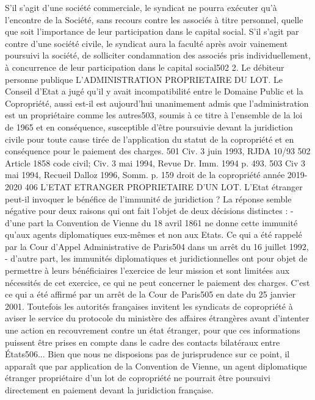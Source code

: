 S’il s’agit d’une société commerciale, le syndicat ne pourra exécuter qu’à l’encontre de la Société, sans recours contre les associés à titre personnel, quelle que soit l’importance de leur participation dans le capital social.
S’il s’agit par contre d’une société civile, le syndicat aura la faculté après avoir vainement poursuivi la société, de solliciter condamnation des associés pris individuellement, à concurrence de leur participation dans le capital social502
2. Le débiteur personne publique
L’ADMINISTRATION PROPRIETAIRE DU LOT.
Le Conseil d’Etat a jugé qu’il y avait incompatibilité entre le Domaine Public et la Copropriété, aussi est-il est aujourd’hui unanimement admis que l’administration est un propriétaire comme les autres503, soumis à ce titre à l’ensemble de la loi de 1965 et en conséquence, susceptible d’être poursuivie devant la juridiction civile pour toute cause tirée de l’application du statut de la copropriété et en conséquence pour le paiement des charges.
501 Civ. 3 juin 1993, RJDA 10/93 
502 Article 1858 code civil; Civ. 3 mai 1994, Revue Dr. Imm. 1994 p. 493.
503 Civ 3 mai 1994, Recueil Dalloz 1996, Somm. p. 159
droit de la copropriété année 2019-2020
406
L’ETAT ETRANGER PROPRIETAIRE D’UN LOT.
L’Etat étranger peut-il invoquer le bénéfice de l’immunité de juridiction ? La réponse semble négative pour deux raisons qui ont fait l’objet de deux décisions distinctes :
- d’une part la Convention de Vienne du 18 avril 1861 ne donne cette immunité qu’aux agents diplomatiques eux-mêmes et non aux Etats. Ce qui a été rappelé par la Cour d’Appel Administrative de Paris504 dans un arrêt du 16 juillet 1992,
- d’autre part, les immunités diplomatiques et juridictionnelles ont pour objet de permettre à leurs bénéficiaires l'exercice de leur mission et sont limitées aux nécessités de cet exercice, ce qui ne peut concerner le paiement des charges. C’est ce qui a été affirmé par un arrêt de la Cour de Paris505 en date du 25 janvier 2001.
Toutefois les autorités françaises invitent les syndicats de copropriété à aviser le service du protocole du ministère des affaires étrangères avant d’intenter une action en recouvrement contre un état étranger, pour que ces informations puissent être prises en compte dans le cadre des contacts bilatéraux entre États506...
Bien que nous ne disposions pas de jurisprudence sur ce point, il apparaît que par application de la Convention de Vienne, un agent diplomatique étranger propriétaire d’un lot de copropriété ne pourrait être poursuivi directement en paiement devant la juridiction française.
